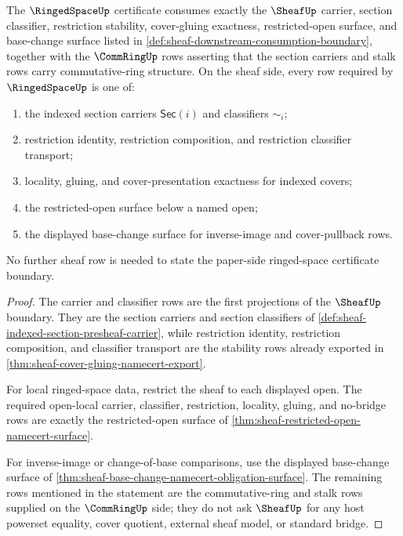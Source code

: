 \begin{theorem}
\label{thm:sheaf-ringedspace-consumption-obligation}
The $\RingedSpaceUp$ certificate consumes exactly the $\SheafUp$ carrier, section classifier, restriction stability, cover-gluing exactness, restricted-open surface, and base-change surface listed in \autoref{def:sheaf-downstream-consumption-boundary}, together with the $\CommRingUp$ rows asserting that the section carriers and stalk rows carry commutative-ring structure. On the sheaf side, every row required by $\RingedSpaceUp$ is one of:
\begin{enumerate}
\item the indexed section carriers $\mathsf{Sec}(i)$ and classifiers $\sim_i$;
\item restriction identity, restriction composition, and restriction classifier transport;
\item locality, gluing, and cover-presentation exactness for indexed covers;
\item the restricted-open surface below a named open;
\item the displayed base-change surface for inverse-image and cover-pullback rows.
\end{enumerate}
No further sheaf row is needed to state the paper-side ringed-space certificate boundary.
\end{theorem}
\begin{proof}
The carrier and classifier rows are the first projections of the $\SheafUp$ boundary. They are the section carriers and section classifiers of \autoref{def:sheaf-indexed-section-presheaf-carrier}, while restriction identity, restriction composition, and classifier transport are the stability rows already exported in \autoref{thm:sheaf-cover-gluing-namecert-export}.

For local ringed-space data, restrict the sheaf to each displayed open. The required open-local carrier, classifier, restriction, locality, gluing, and no-bridge rows are exactly the restricted-open surface of \autoref{thm:sheaf-restricted-open-namecert-surface}.

For inverse-image or change-of-base comparisons, use the displayed base-change surface of \autoref{thm:sheaf-base-change-namecert-obligation-surface}. The remaining rows mentioned in the statement are the commutative-ring and stalk rows supplied on the $\CommRingUp$ side; they do not ask $\SheafUp$ for any host powerset equality, cover quotient, external sheaf model, or standard bridge.
\end{proof}

